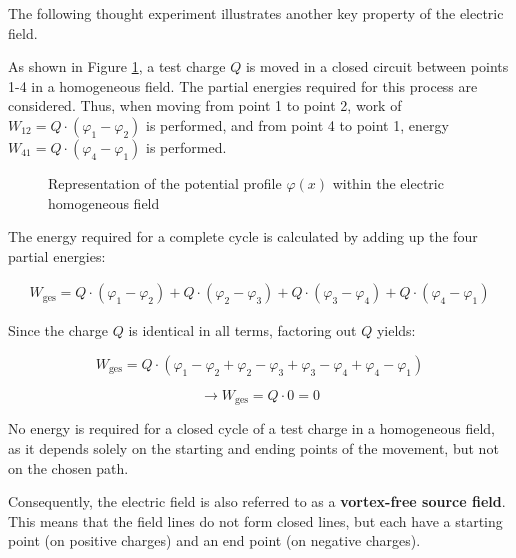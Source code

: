 \begin{frame}
{	The following thought experiment illustrates another key property of the electric field.
	
	As shown in Figure \ref{fig:wirbelfrei}, a test charge $Q$ is moved in a closed circuit between points 1-4 in a homogeneous field.
 	The partial energies required for this process are considered.
	Thus, when moving from point 1 to point 2, work of $W_{12} = Q \cdot (\varphi_1 - \varphi_2)$ is performed, 
    and from point 4 to point 1, energy $W_{41} = Q \cdot (\varphi_4 - \varphi_1)$ is performed.


	\begin{figure}[h!]
		\renewcommand{\figurename}{Figure}
		\centering
		
		\caption{Representation of the potential profile $\varphi(x)$ within the electric homogeneous field}
		\label{fig:wirbelfrei}
	\end{figure}



	The energy required for a complete cycle is calculated by adding up the four partial energies:

	
	\begin{equation*}
		\begin{split}
			W_\mathrm{ges} = Q \cdot (\varphi_1 - \varphi_2) + Q \cdot (\varphi_2 - \varphi_3)
			+ Q \cdot (\varphi_3 - \varphi_4) + Q \cdot (\varphi_4 - \varphi_1)
		\end{split}
	\end{equation*}

	Since the charge $Q$ is identical in all terms, factoring out $Q$ yields:


	\begin{equation*}
			W_\mathrm{ges} = Q \cdot (\varphi_1 - \varphi_2 + \varphi_2 - \varphi_3
			+ \varphi_3 - \varphi_4 + \varphi_4 - \varphi_1) 
	\end{equation*}
	
	\begin{equation*}
		\rightarrow W_\mathrm{ges} = Q \cdot 0 = 0
	\end{equation*}

	No energy is required for a closed cycle of a test charge in a homogeneous field,
    as it depends solely on the starting and ending points of the movement, but not on the chosen path. 

	Consequently, the electric field is also referred to as a \textbf{vortex-free source field}.
	This means that the field lines do not form closed lines, but each have a starting point (on positive charges)
	and an end point (on negative charges).
		
}
\end{frame}
